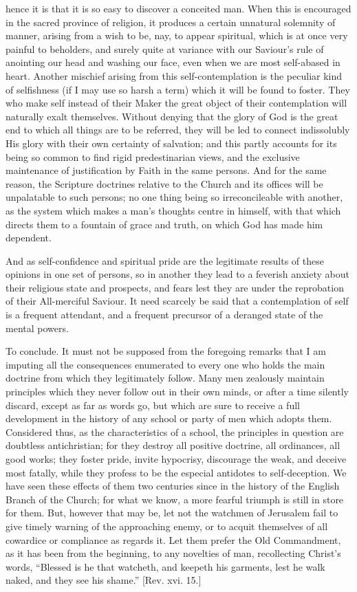 hence it is that it is so easy to discover a conceited man. When this is
encouraged in the sacred province of religion, it produces a certain
unnatural solemnity of manner, arising from a wish to be, nay, to appear
spiritual, which is at once very painful to beholders, and surely quite
at variance with our Saviour's rule of anointing our head and washing
our face, even when we are most self-abased in heart. Another mischief
arising from this self-contemplation is the peculiar kind of selfishness
(if I may use so harsh a term) which it will be found to foster. They
who make self instead of their Maker the great object of their
contemplation will naturally exalt themselves. Without denying that the
glory of God is the great end to which all things are to be referred,
they will be led to connect indissolubly His glory with their own
certainty of salvation; and this partly accounts for its being so common
to find rigid predestinarian views, and the exclusive maintenance of
justification by Faith in the same persons. And for the same reason, the
Scripture doctrines relative to the Church and its offices will be
unpalatable to such persons; no one thing being so irreconcileable with
another, as the system which makes a man's thoughts centre in himself,
with that which directs them to a fountain of grace and truth, on which
God has made him dependent.

And as self-confidence and spiritual pride are the legitimate results
of these opinions in one set of persons, so in another they lead to a
feverish anxiety about their religious state and prospects, and fears
lest they are under the reprobation of their All-merciful Saviour. It
need scarcely be said that a contemplation of self is a frequent
attendant, and a frequent precursor of a deranged state of the mental
powers.

To conclude. It must not be supposed from the foregoing remarks that
I am imputing all the consequences enumerated to every one who holds the
main doctrine from which they legitimately follow. Many men zealously
maintain principles which they never follow out in their own minds, or
after a time silently discard, except as far as words go, but which are
sure to receive a full development in the history of any school or party
of men which adopts them. Considered thus, as the characteristics of a
school, the principles in question are doubtless antichristian; for they
destroy all positive doctrine, all ordinances, all good works; they
foster pride, invite hypocrisy, discourage the weak, and deceive most
fatally, while they profess to be the especial antidotes to
self-deception. We have seen these effects of them two centuries since
in the history of the English Branch of the Church; for what we know, a
more fearful triumph is still in store for them. But, however that may
be, let not the watchmen of Jerusalem fail to give timely warning of the
approaching enemy, or to acquit themselves of all cowardice or
compliance as regards it. Let them prefer the Old Commandment, as it has
been from the beginning, to any novelties of man, recollecting Christ's
words, ``Blessed is he that watcheth, and keepeth his garments, lest he
walk naked, and they see his shame.'' [Rev. xvi. 15.]

